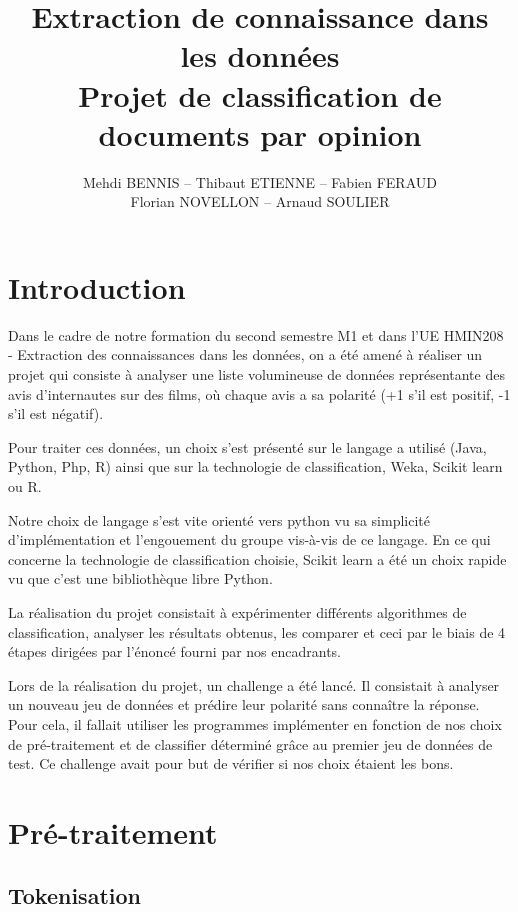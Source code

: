 \documentclass[a4paper]{report}
\title{Extraction de connaissance dans les données\\Projet de classification de documents par opinion}
\author{Mehdi BENNIS -- Thibaut ETIENNE -- Fabien FERAUD\\Florian NOVELLON -- Arnaud SOULIER}
\begin{document}
    \maketitle

    \newpage
    \null
    \newpage

    \tableofcontents
    \newpage

    \chapter{Introduction}

        Dans le cadre de notre formation du second semestre M1 et dans l’UE HMIN208 - Extraction des connaissances dans les données, on a été amené à réaliser un projet qui consiste à analyser une liste volumineuse de données représentante des avis d’internautes sur des films, où chaque avis a sa polarité (+1 s’il est positif, -1 s’il est négatif).

        Pour traiter ces données, un choix s’est présenté sur le langage a utilisé (Java, Python, Php, R) ainsi que sur la technologie de classification, Weka, Scikit learn ou R.

        Notre choix de langage s’est vite orienté vers python vu sa simplicité d’implémentation et l’engouement du groupe vis-à-vis de ce langage.
        En ce qui concerne la technologie de classification choisie, Scikit learn a été un choix rapide vu que c’est une bibliothèque libre Python.

        La réalisation du projet consistait à expérimenter différents algorithmes de classification, analyser les résultats obtenus, les comparer et ceci par le biais de 4 étapes dirigées par l’énoncé fourni par nos encadrants.

        Lors de la réalisation du projet, un challenge a été lancé. Il consistait à analyser un nouveau jeu de données et prédire leur polarité sans connaître la réponse. Pour cela, il fallait utiliser les programmes implémenter en fonction de nos choix de pré-traitement et de classifier déterminé grâce au premier jeu de données de test. Ce challenge avait pour but de vérifier si nos choix étaient les bons.

    \chapter{Pré-traitement}

        \section{Tokenisation}
\end{document}
